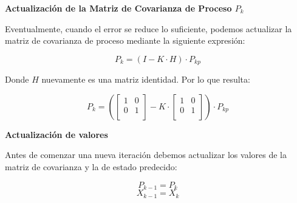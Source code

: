 \textbf{Actualización de la Matriz de Covarianza de Proceso $P_k$} \mbox{} \vspace{10pt}

Eventualmente, cuando el error se reduce lo suficiente, podemos actualizar la matriz de covarianza de proceso mediante la siguiente expresión:

$$ P_k = ( I - K \cdot H ) \cdot P_{kp} $$

Donde $H$ nuevamente es una matriz identidad. Por lo que resulta:

$$ P_k =
    (
    \begin{bmatrix}
    1 & 0 \\
    0 & 1  \\
    \end{bmatrix}
    -
    K
    \cdot
    \begin{bmatrix}
    1 & 0 \\
    0 & 1  \\
    \end{bmatrix}
    )
    \cdot
    P_{kp}
$$

\textbf{Actualización de valores} \mbox{} \vspace{10pt}

Antes de comenzar una nueva iteración debemos actualizar los valores de la matriz de covarianza y la de estado predecido:

$$ P_{k-1} = P_k $$
$$ X_{k-1} = X_k $$